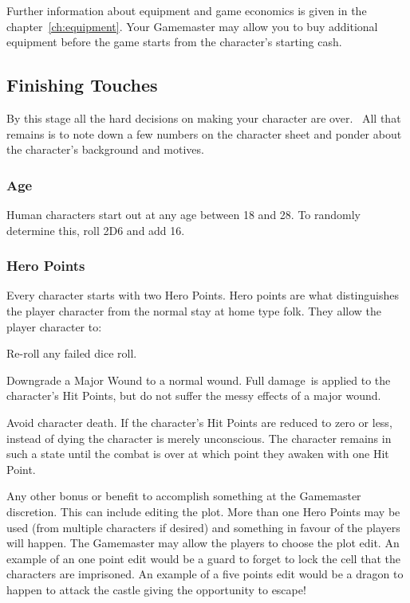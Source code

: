 Further information about equipment and game economics is given in the chapter~\ref{ch:equipment}. Your Gamemaster may allow you to buy additional equipment before the game starts from the character’s starting cash.

\subsection{Finishing Touches}
By this stage all the hard decisions on making your character are over.  All that remains is to note down a few numbers on the character sheet and ponder about the character’s background and motives.

\subsubsection{Age}
Human characters start out at any age between 18 and 28. To randomly determine this, roll 2D6 and add 16. 

\subsubsection{Hero Points}
Every character starts with two Hero Points. Hero points are what distinguishes the player character from the normal stay at home type folk. They allow the player character to:

\begin{rpg-list}
	\item Re-roll any failed dice roll.
	\item Downgrade a Major Wound to a normal wound. Full damage is applied to the character's Hit Points, but do not suffer the messy effects of a major wound.
	\item Avoid character death. If the character’s Hit Points are reduced to zero or less, instead of dying the character is merely unconscious. The character remains in such a state until the combat is over at which point they awaken with one Hit Point.
	\item Any other bonus or benefit to accomplish something at the Gamemaster discretion. This can include editing the plot. More than one Hero Points may be used (from multiple characters if desired) and something in favour of the players will happen. The Gamemaster may allow the players to choose the plot edit. An example of an one point edit would be a guard to forget to lock the cell that the characters are imprisoned. An example of a five points edit would be a dragon to happen to attack the castle giving the opportunity to escape!
\end{rpg-list}


